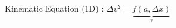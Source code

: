 \documentclass[border=0.5cm,preview]{standalone}
\begin{document}
   
Kinematic Equation (1D) : $\Delta v^2 = \underbrace{f(a,\Delta x)}_{?}$
\end{document}
